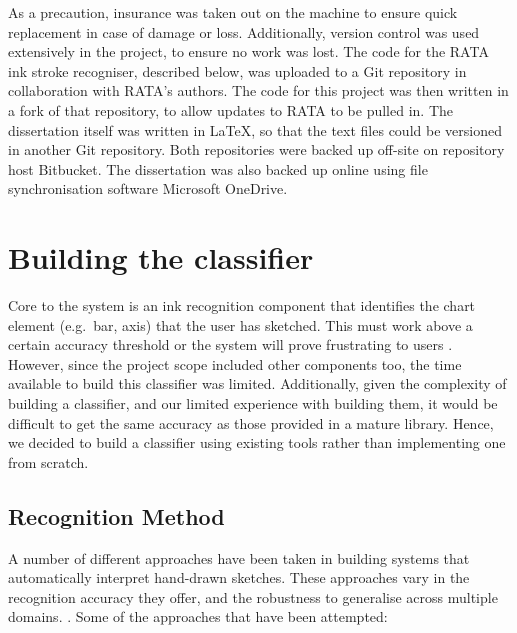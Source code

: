 	As a precaution, insurance was taken out on the machine to ensure quick replacement in case of damage or loss. Additionally, version control was used extensively in the project, to ensure no work was lost. The code for the RATA ink stroke recogniser, described below, was uploaded to a Git repository in collaboration with RATA's authors. The code for this project was then written in a fork of that repository, to allow updates to RATA to be pulled in. The dissertation itself was written in \LaTeX , so that the text files could be versioned in another Git repository. Both repositories were backed up off-site on repository host Bitbucket. The dissertation was also backed up online using file synchronisation software Microsoft OneDrive. 
	
	\section{Building the classifier}	
	Core to the system is an ink recognition component that identifies the chart element (e.g.\ bar, axis) that the user has sketched. This must work above a certain accuracy threshold or the system will prove frustrating to users \citep{frankish_recognition_1995}. However, since the project scope included other components too, the time available to build this classifier was limited. Additionally, given the complexity of building a classifier, and our limited experience with building them, it would be difficult to get the same accuracy as those provided in a mature library. Hence, we decided to build a classifier using existing tools rather than implementing one from scratch. 
	
	\subsection{Recognition Method}
	A number of different approaches have been taken in building systems that automatically interpret hand-drawn sketches. These approaches vary in the recognition accuracy they offer, and the robustness to generalise across multiple domains. \citep{ouyang_visual_2009}. Some of the approaches that have been attempted:
	
